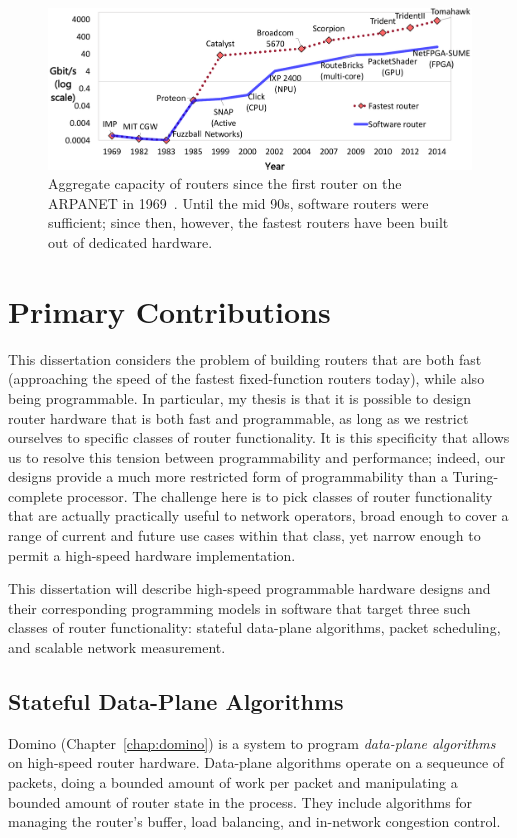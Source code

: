 \begin{figure}
\centering
\includegraphics[width=\columnwidth]{router_evolution.pdf}
\caption{Aggregate capacity of routers since the first router on the ARPANET in
1969~\cite{imp}. Until the mid 90s, software routers were sufficient; since
then, however, the fastest routers have been built out of dedicated hardware.}
\label{fig:router_evolution}
\end{figure}

\section{Primary Contributions}

This dissertation considers the problem of building routers that are both fast
(\ie approaching the speed of the fastest fixed-function routers today), while
also being programmable. In particular, my thesis is that it is possible to
design router hardware that is both fast and programmable, as long as we
restrict ourselves to specific classes of router functionality. It is this
specificity that allows us to resolve this tension between programmability and
performance; indeed, our designs provide a much more restricted form of
programmability than a Turing-complete processor. The challenge here is to pick
classes of router functionality that are actually practically useful to network
operators, broad enough to cover a range of current and future use cases within
that class, yet narrow enough to permit a high-speed hardware implementation.

This dissertation will describe high-speed programmable hardware designs and
their corresponding programming models in software that target three such
classes of router functionality: stateful data-plane algorithms, packet
scheduling, and scalable network measurement.

\subsection{Stateful Data-Plane Algorithms}
Domino (Chapter~\ref{chap:domino}) is a system to program \textit{data-plane
algorithms} on high-speed router hardware. Data-plane algorithms operate on a
sequeunce of packets, doing a bounded amount of work per packet and
manipulating a bounded amount of router state in the process.  They include
algorithms for managing the router's buffer, load balancing, and in-network
congestion control.


